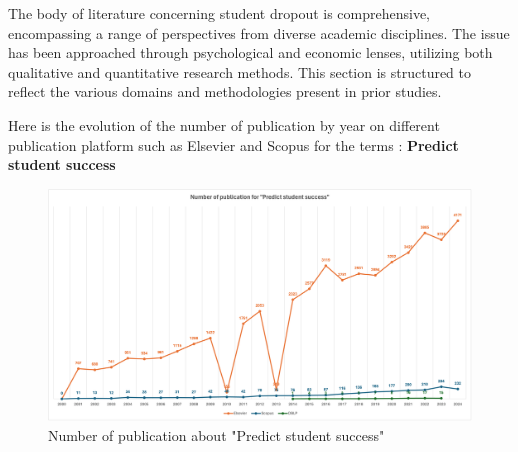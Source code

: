 \documentclass[../../main.tex]{subfiles}
\begin{document}
The body of literature concerning student dropout is comprehensive, encompassing a range of perspectives from diverse academic disciplines. The issue has been approached through psychological and economic lenses, utilizing both qualitative and quantitative research methods. This section is structured to reflect the various domains and methodologies present in prior studies.

Here is the evolution of the number of publication by year on different publication platform such as Elsevier and Scopus for the terms : \textbf{Predict student success}
\begin{figure}[H]
    \centering
    \includegraphics[width=1\linewidth]{res//graph/numberOfPub.png}
    \caption{Number of publication about "Predict student success"}
    \label{fig:nb_pub}
\end{figure}
\end{document}

